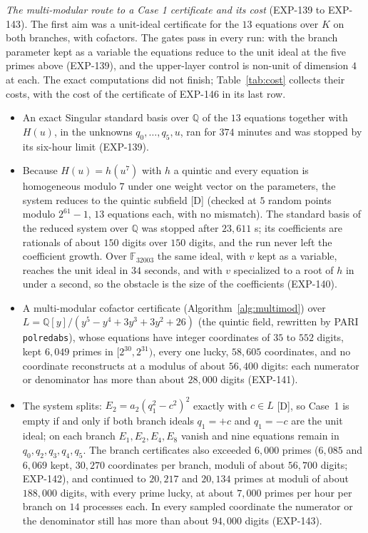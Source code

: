 \documentclass[11pt]{article}
\theoremstyle{remark}
\newcommand{\Q}{\mathbb{Q}}
\begin{document}
\emph{The multi-modular route to a Case 1 certificate and its cost} (EXP-139 to EXP-143). The first aim was a unit-ideal
certificate for the $13$ equations over $K$ on both branches, with cofactors. The gates pass in every run: with the branch parameter kept as a variable the equations reduce to the unit ideal at the five primes above (EXP-139), and the upper-layer control is non-unit of
dimension $4$ at each. The exact computations did not finish; Table~\ref{tab:cost} collects their costs, with the cost of the certificate of EXP-146 in its last row.

\begin{itemize}
\item An exact Singular standard basis over $\Q$ of the $13$ equations together with $H(u)$, in the unknowns $q_0,\dots,q_5,u$, ran for
$374$ minutes and was stopped by its six-hour limit (EXP-139).
\item Because $H(u)=h(u^7)$ with $h$ a quintic and every equation is homogeneous modulo $7$ under one weight vector on the parameters, the
system reduces to the quintic subfield [D] (checked at $5$ random points modulo $2^{61}-1$, $13$ equations each, with no mismatch). The
standard basis of the reduced system over $\Q$ was stopped after $23{,}611$ s; its coefficients are rationals of about $150$ digits over $150$ digits,
and the run never left the coefficient growth. Over $\mathbb F_{32003}$ the same ideal, with $v$ kept as a variable, reaches the unit ideal in $34$ seconds, and
with $v$ specialized to a root of $h$ in under a second, so the obstacle is the size of the coefficients (EXP-140).
\item A multi-modular cofactor certificate (Algorithm~\ref{alg:multimod}) over $L=\Q[y]/(y^5-y^4+3y^3+3y^2+26)$ (the quintic field, rewritten by PARI
\texttt{polredabs}), whose equations have integer coordinates of $35$ to $552$ digits, kept $6{,}049$ primes in $[2^{30},2^{31})$, every one lucky,
$58{,}605$ coordinates, and no coordinate reconstructs at a modulus of about $56{,}400$ digits: each numerator or denominator has more than about
$28{,}000$ digits (EXP-141).
\item The system splits: $E_2=a_2(q_1^2-c^2)^2$ exactly with $c\in L$ [D], so Case~1 is empty if and only if both branch ideals $q_1=+c$ and $q_1=-c$ are the unit ideal;
on each branch $E_1,E_2,E_4,E_8$ vanish and nine equations remain in $q_0,q_2,q_3,q_4,q_5$. The branch certificates also exceeded $6{,}000$ primes
($6{,}085$ and $6{,}069$ kept, $30{,}270$ coordinates per branch, moduli of about $56{,}700$ digits; EXP-142), and continued to $20{,}217$ and
$20{,}134$ primes at moduli of about $188{,}000$ digits, with every prime lucky, at about $7{,}000$ primes per hour per branch on $14$ processes each. In every
sampled coordinate the numerator or the denominator still has more than about $94{,}000$ digits (EXP-143).
\end{itemize}
\end{document}
